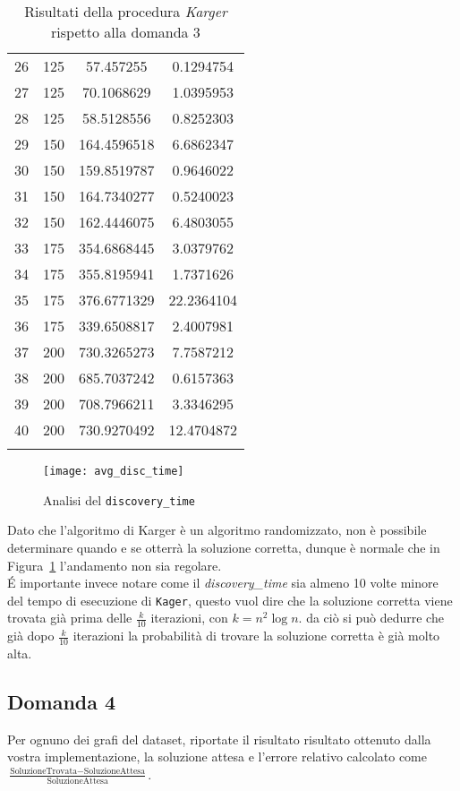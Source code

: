 \begin{center}
\begin{longtable}{|c|c|c|c|}
		26 & 125 & 57.457255 & 0.1294754 \\		
		27 & 125 & 70.1068629 & 1.0395953 \\		 
		28 & 125 & 58.5128556 & 0.8252303 \\		 
		29 & 150 & 164.4596518 & 6.6862347 \\	  
		30 & 150 & 159.8519787 & 0.9646022 \\	    
		31 & 150 & 164.7340277 & 0.5240023 \\		 
		32 & 150 & 162.4446075 & 6.4803055 \\		 
		33 & 175 & 354.6868445 & 3.0379762 \\		 
		34 & 175 & 355.8195941 & 1.7371626 \\	   	
		35 & 175 & 376.6771329 & 22.2364104 \\	  	 
		36 & 175 & 339.6508817 & 2.4007981 \\	 
		37 & 200 & 730.3265273 & 7.7587212 \\		 
		38 & 200 & 685.7037242 & 0.6157363 \\	  
		39 & 200 & 708.7966211 & 3.3346295 \\	  
		40 & 200 & 730.9270492 & 12.4704872 \\	
		\hline
		\caption{Risultati della procedura \textit{Karger} rispetto alla domanda 3}
		\label{dt-results}
	\end{longtable}
\end{center}\vspace{-40pt}

\begin{figure}[H]
	\centering
	\texttt{[image: avg\_disc\_time]}
	\caption{Analisi del \texttt{discovery\_time}}
	\label{dt-confronto}
\end{figure}

Dato che l'algoritmo di Karger è un algoritmo randomizzato, non è possibile determinare quando e se otterrà la soluzione corretta, dunque è normale che in Figura~\ref{dt-confronto} l'andamento non sia regolare.\\
\'E importante invece notare come il \textit{discovery\_time} sia almeno 10 volte minore del tempo di esecuzione di \texttt{Kager}, questo vuol dire che la soluzione corretta viene trovata già prima delle $\frac{k}{10}$ iterazioni, con $k = n^2 \log n$. da ciò si può dedurre che già dopo $\frac{k}{10}$ iterazioni la probabilità di trovare la soluzione corretta è già molto alta.

\subsection{Domanda 4}
Per ognuno dei grafi del dataset, riportate il risultato risultato ottenuto dalla vostra implementazione, la soluzione attesa e l'errore relativo calcolato come $ \frac{\textrm{SoluzioneTrovata}-\textrm{SoluzioneAttesa}}{\textrm{SoluzioneAttesa}}$.


